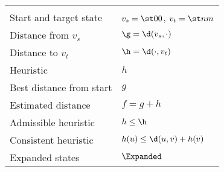 \begin{tabular}[t]{ll}
  \midrule
  \textbf{\A} & \\
  \tabindent Start and target state & $v_s = \st 00$, $v_t = \st nm$ \\
  \tabindent Distance from $v_s$ & $\g = \d(v_s, \cdot)$\\
  \tabindent Distance to $v_t$& $\h = \d(\cdot, v_t)$\\
  \tabindent Heuristic & $h$\\
  \tabindent Best distance from start & $g$  \\
  \tabindent Estimated distance & $f = g + h$\\
  \tabindent Admissible heuristic & $h \leq \h$\\
  \tabindent Consistent heuristic & $h(u) \leq \d(u,v) + h(v)$\\
  \tabindent Expanded states & $\Expanded$\\
  \bottomrule
\end{tabular}

